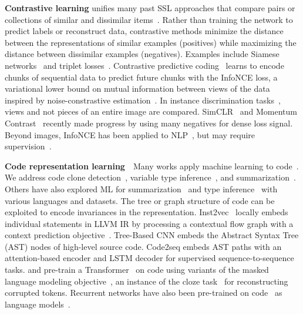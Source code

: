 \documentclass{article}
\begin{document}
\textbf{Contrastive learning} unifies many past SSL approaches that compare pairs or collections of similar and dissimilar items~\citep{hadsell2006dimensionality}. Rather than training the network to predict labels or reconstruct data, contrastive methods minimize the distance between the representations of similar examples (positives) while maximizing the distance between dissimilar examples (negatives). Examples include Siamese networks~\citep{bromley1994signature} and triplet losses~\citep{schroff2015facenet}. Contrastive predictive coding~\citep{cpcv1_oord2018representation, henaff2019data} learns to encode chunks of sequential data to predict future chunks with the InfoNCE loss, a variational lower bound on mutual information between views of the data~\citep{tian2019contrastive, wu2020mutual} inspired by noise-constrastive estimation~\citep{gutmann2010noise}. In instance discrimination tasks~\citep{wu2018unsupervised}, views and not pieces of an entire image are compared. SimCLR~\citep{chen2020simple} and Momentum Contrast~\citep{he2019momentum, chen2020improved} recently made progress by using many negatives for dense loss signal. Beyond images, InfoNCE has been applied to NLP~\citep{chuang2020debiased, giorgi2020declutr}, but may require supervision~\citep{Fang_2020}.

\textbf{Code representation learning}~~Many works apply machine learning to code~\citep{allamanis2018survey}. We address code clone detection~\cite{white2016deep}, variable type inference~\citep{hellendoorn2018deep}, and summarization~\cite{alon2018code2seq}. Others have also explored ML for summarization~\citep{movshovitz2013natural, allamanis2016convolutional, iyer2016summarizing} and type inference~\citep{pradel2019typewriter, p2020opttyper, Wei2020LambdaNet, allamanis2020typilus, bielik2020adversarial} with various languages and datasets.
The tree or graph structure of code can be exploited to encode invariances in the representation. Inst2vec~\citep{ben2018neural} locally embeds individual statements in LLVM IR by processing a contextual flow graph with a context prediction objective~\citep{mikolov2013distributed}.
Tree-Based CNN embeds the Abstract Syntax Tree (AST) nodes of high-level source code. 
Code2seq \citep{alon2018code2seq} embeds AST paths with an attention-based encoder and LSTM decoder for supervised sequence-to-sequence tasks.
\citet{cuBERT} and \citet{feng2020codebert} pre-train a Transformer~\citep{vaswani2017attention} on code using variants of the masked language modeling objective~\citep{devlin2018bert}, an instance of the cloze task~\citep{taylor1953cloze} for reconstructing corrupted tokens. Recurrent networks have also been pre-trained on code~\citep{Hussain_2020} as language models~\citep{Peters:2018, karampatsis2020scelmo}.
\end{document}
